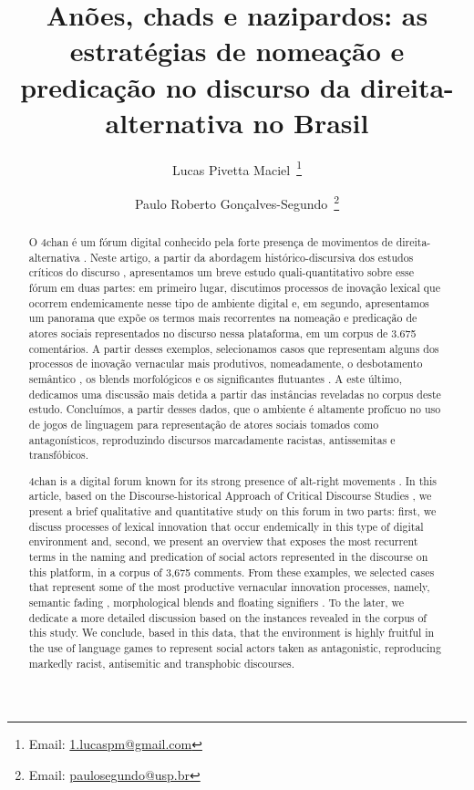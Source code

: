 \documentclass[portuguese]{textolivre}
\title{Anões, chads e nazipardos: as estratégias de nomeação e predicação no discurso da direita-alternativa no Brasil}
\author[1]{Lucas Pivetta Maciel~\orcid{0000-0002-6247-037X}\thanks{Email: \href{1.lucaspm@gmail.com}{1.lucaspm@gmail.com}}}
\author[1]{Paulo Roberto Gonçalves-Segundo~\orcid{0000-0002-5592-8098}\thanks{Email: \href{paulosegundo@usp.br}{paulosegundo@usp.br}}}
\affil[1]{Universidade de São Paulo, Faculdade de Filosofia Letras e Ciências Humanas, São Paulo, SP, Brasil.}
\begin{document}
\maketitle

\begin{polyabstract}
\begin{abstract}
O 4chan é um fórum digital conhecido pela forte presença de movimentos de direita-alternativa \cite{nagle2017kill, tuters2018larping}. Neste artigo, a partir da abordagem histórico-discursiva \cite{wodakreisigl2016} dos
estudos críticos do discurso \cite{wodameyer2016}, apresentamos um breve estudo quali-quantitativo sobre
esse fórum em duas partes: em primeiro lugar, discutimos processos de inovação lexical que ocorrem
endemicamente nesse tipo de ambiente digital e, em segundo, apresentamos um panorama que expõe os termos
mais recorrentes na nomeação e predicação de atores sociais representados no discurso nessa plataforma, em
um corpus de 3.675 comentários. A partir desses exemplos, selecionamos casos que representam alguns dos
processos de inovação vernacular mais produtivos, nomeadamente, o desbotamento semântico \cite{peeters2021vernacular}, os blends morfológicos e os significantes flutuantes \cite{tutershagen2020they}. A este último, dedicamos
uma discussão mais detida a partir das instâncias reveladas no corpus deste estudo. Concluímos, a partir desses
dados, que o ambiente é altamente profícuo no uso de jogos de linguagem para representação de atores sociais
tomados como antagonísticos, reproduzindo discursos marcadamente racistas, antissemitas e transfóbicos.

\end{abstract}

\begin{english}
\begin{abstract}
4chan is a digital forum known for its strong presence of alt-right movements \cite{nagle2017kill, tuters2020esoteric}. In this article, based on the Discourse-historical Approach \cite{wodakreisigl2016} of Critical Discourse
Studies \cite{wodameyer2016}, we present a brief qualitative and quantitative study on this forum in two parts:
first, we discuss processes of lexical innovation that occur endemically in this type of digital environment and,
second, we present an overview that exposes the most recurrent terms in the naming and predication of social
actors represented in the discourse on this platform, in a corpus of 3,675 comments. From these examples, we
selected cases that represent some of the most productive vernacular innovation processes, namely, semantic
fading \cite{peeters2021vernacular}, morphological blends and floating signifiers \cite{tutershagen2020they}. To the
later, we dedicate a more detailed discussion based on the instances revealed in the corpus of this study. We
conclude, based in this data, that the environment is highly fruitful in the use of language games to represent social
actors taken as antagonistic, reproducing markedly racist, antisemitic and transphobic discourses.


\end{abstract}
\end{english}
\end{polyabstract}
\end{document}
